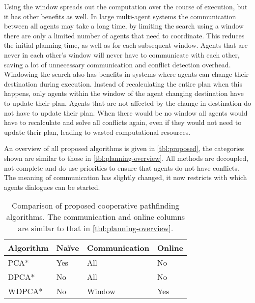 Using the window spreads out the computation over the course of execution, but
it has other benefits as well. In large multi-agent systems the communication
between all agents may take a long time, by limiting the search using a window
there are only a limited number of agents that need to coordinate. This reduces
the initial planning time, as well as for each subsequent window. Agents that
are never in each other's window will never have to communicate with each other,
saving a lot of unnecessary communication and conflict detection overhead.
Windowing the search also has benefits in systems where agents can change their
destination during execution. Instead of recalculating the entire plan when
this happens, only agents within the window of the agent changing destination
have to update their plan. Agents that are not affected by the change in
destination do not have to update their plan. When there would be no window all
agents would have to recalculate and solve all conflicts again, even if they
would not need to update their plan, leading to wasted computational resources.

An overview of all proposed algorithms is given in \autoref{tbl:proposed}, the
categories shown are similar to those in \autoref{tbl:planning-overview}. All
methods are decoupled, not complete and do use priorities to ensure that agents
do not have conflicts. The meaning of communication has slightly changed, it
now restricts with which agents dialogues can be started.

\begin{table}
    \centering
    \caption{Comparison of proposed cooperative pathfinding algorithms. The
    communication and online columns are similar to that in
    \autoref{tbl:planning-overview}.}
    \label{tbl:proposed}
    \begin{tabular}{l|l|l|l}
        Algorithm & Na\"ive & Communication & Online \\ \hline
        PCA*   & Yes & All & No \\
        DPCA*  & No  & All & No \\
        WDPCA* & No  & Window & Yes \\
    \end{tabular}
\end{table}